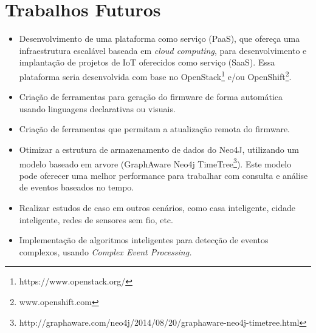 \section{Trabalhos Futuros}
\begin{itemize}
\item Desenvolvimento de uma plataforma como serviço (PaaS), que ofereça
uma infraestrutura escalável baseada em \emph{cloud computing}, para
desenvolvimento e implantação de projetos de IoT oferecidos como serviço
(SaaS). Essa plataforma seria desenvolvida com base no OpenStack\footnote{https://www.openstack.org/}
e/ou OpenShift\footnote{www.openshift.com}.
\item Criação de ferramentas para geração do firmware de forma automática
usando linguagens declarativas ou visuais.
\item Criação de ferramentas que permitam a atualização remota do firmware.
\item Otimizar a estrutura de armazenamento de dados do Neo4J, utilizando
um modelo baseado em arvore (GraphAware Neo4j TimeTree\footnote{http://graphaware.com/neo4j/2014/08/20/graphaware-neo4j-timetree.html}).
Este modelo pode oferecer uma melhor performance para trabalhar com
consulta e análise de eventos baseados no tempo.
\item Realizar estudos de caso em outros cenários, como casa inteligente,
cidade inteligente, redes de sensores sem fio, etc.
\item Implementação de algoritmos inteligentes para detecção de eventos
complexos, usando \emph{Complex Event Processing.}
\end{itemize}

